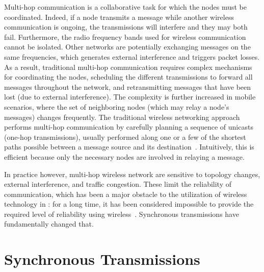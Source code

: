 Multi-hop communication is a collaborative task for which the nodes must be coordinated.
Indeed, if a node transmits a message while another wireless communication is ongoing, the transmissions will interfere and they may both fail.
Furthermore, the radio frequency bands used for wireless communication cannot be isolated. Other networks are potentially exchanging messages on the same frequencies, which generates external interference and triggers packet losses.
As a result, traditional multi-hop communication requires complex mechanisms for coordinating the nodes, scheduling the different transmissions to forward all messages throughout the network, and retransmitting messages that have been lost (\eg due to external interference).
The complexity is further increased in mobile scenarios, where the set of neighboring nodes (which may relay a node's messages) changes frequently.
%
The traditional wireless networking approach performs multi-hop communication by carefully planning a sequence of unicasts (\ie one-hop transmissions), usually performed along one or a few of the shortest paths possible between a message source and its destination~\cite{watteyne2016Industrial,kim2017Challenging, mottola2011MUSTER}.
Intuitively, this is efficient because only the necessary nodes are involved in relaying a message.

In practice however, multi-hop wireless network are sensitive to topology changes, external interference, and traffic congestion. These limit the reliability of communication, which has been a major obstacle to the utilization of wireless technology in \CPS: for a long time, it has been considered impossible to provide the required level of reliability using wireless~\cite{stankovic2005Opportunities}.
Synchronous transmissions have fundamentally changed that.

\section{Synchronous Transmissions}
\label{sec:ST}

